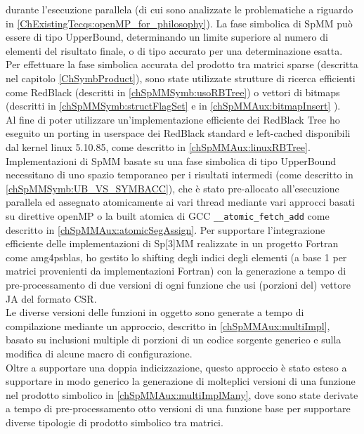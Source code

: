 durante l'esecuzione parallela (di cui sono analizzate le problematiche a riguardo in \ref{ChExistingTecqs:openMP_for_philosophy}).
La fase simbolica di SpMM può essere di tipo UpperBound, determinando un limite superiore al numero di elementi \nnz del risultato finale,
o di tipo accurato per una determinazione esatta.\\
Per effettuare la fase simbolica accurata del prodotto tra matrici sparse (descritta nel capitolo \ref{ChSymbProduct}),
sono state utilizzate strutture di ricerca efficienti come RedBlack (descritti in \ref{chSpMMSymb:usoRBTree})
o vettori di bitmaps (descritti in \ref{chSpMMSymb:structFlagSet} e in \ref{chSpMMAux:bitmapInsert} ).\\
Al fine di poter utilizzare un'implementazione efficiente dei RedBlack Tree ho eseguito un porting in userspace
dei RedBlack standard e left-cached disponibili dal kernel linux 5.10.85, come descritto in \ref{chSpMMAux:linuxRBTree}.\\
Implementazioni di SpMM basate su una fase simbolica di tipo UpperBound necessitano di uno spazio temporaneo per i risultati intermedi
(come descritto in  \ref{chSpMMSymb:UB_VS_SYMBACC}), che è stato pre-allocato all'esecuzione parallela ed 
assegnato atomicamente ai vari thread mediante vari approcci basati su direttive openMP o la built atomica di GCC
\verb|__atomic_fetch_add| come descritto in \ref{chSpMMAux:atomicSegAssign}.
\voidLine
Per supportare l'integrazione efficiente delle implementazioni di Sp[3]MM realizzate in un progetto Fortran come 
amg4psblas, ho gestito lo shifting degli indici degli elementi \nnz (a base 1 per matrici provenienti da implementazioni Fortran)
con la generazione a tempo di pre-processamento di due versioni di ogni 
funzione che usi (porzioni del) vettore JA del formato CSR.\\
Le diverse versioni delle funzioni in oggetto sono generate a tempo di compilazione
mediante un approccio, descritto in \ref{chSpMMAux:multiImpl}, basato su 
inclusioni multiple di porzioni di un codice sorgente generico e sulla modifica di alcune macro di configurazione.\\
Oltre a supportare una doppia indicizzazione, questo approccio è stato esteso a 
supportare in modo generico la generazione di molteplici versioni di una funzione nel prodotto simbolico in \ref{chSpMMAux:multiImplMany}, 
dove sono state derivate a tempo di pre-processamento otto versioni di una funzione base  per 
supportare diverse tipologie di prodotto simbolico tra matrici.

